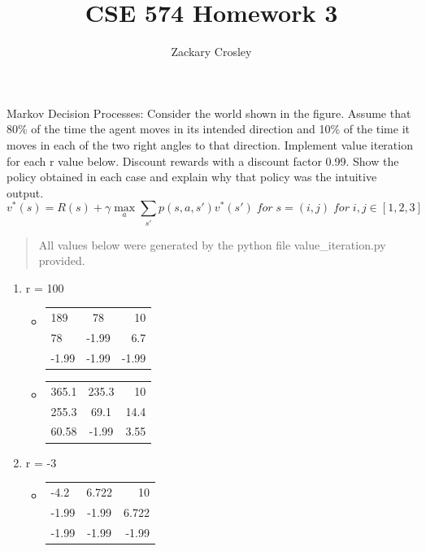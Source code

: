\documentclass[11pt]{article}
\newenvironment{problem}[2][Problem]{\begin{trivlist}
\item[\hskip \labelsep {\bfseries #1}\hskip \labelsep {\bfseries #2.}]}{\end{trivlist}}
\begin{document}
\title{CSE 574 Homework 3}
\author{Zackary Crosley}
\maketitle

\begin{problem}{1} Markov Decision Processes: Consider the world shown in the figure. Assume that 80\% of the time the agent moves in its intended direction and 10\% of the time it moves in each of the two right angles to that direction. Implement value iteration for each r value below. Discount rewards with a discount factor 0.99. Show the policy obtained in each case and explain why that policy was the intuitive output.
	\begin{equation}
			v^{*} (s) = R(s) + \gamma \max_a \sum_{s'} p(s,a,s') v^{*} (s') \;for\;s = (i,j)\;for\;i, j \in [1, 2, 3]
	\end{equation}
	\begin{verse}
		All values below were generated by the python file value_iteration.py provided.
	\end{verse}
\begin{enumerate}
	\item r = 100
		\begin{itemize}
			\item[Iteration 1]
				\begin{tabular}{l c r}
					189 & 78 & 10 \\
					78 & -1.99 & 6.7 \\
					-1.99 & -1.99 & -1.99 \\
				\end{tabular}
			\item[Iteration 2]
				\begin{tabular}{l c r}
					365.1 & 235.3 & 10 \\
					255.3 & 69.1 & 14.4 \\
					60.58 & -1.99 & 3.55 \\
				\end{tabular}
		\end{itemize}
	\item r = -3
		\begin{itemize}
			\item[Iteration 1]
				\begin{tabular}{l c r}
					-4.2 & 6.722 & 10 \\
					-1.99 & -1.99 & 6.722 \\
					-1.99 & -1.99 & -1.99 \\
				\end{tabular}

\end{itemize}
\end{enumerate}
\end{problem}
\end{document}
